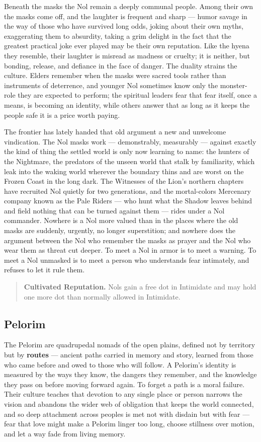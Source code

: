 Beneath the masks the Nol remain a deeply communal people. Among their own the masks come off, and the laughter is frequent and sharp --- humor savage in the way of those who have survived long odds, joking about their own myths, exaggerating them to absurdity, taking a grim delight in the fact that the greatest practical joke ever played may be their own reputation. Like the hyena they resemble, their laughter is misread as madness or cruelty; it is neither, but bonding, release, and defiance in the face of danger. The duality strains the culture. Elders remember when the masks were sacred tools rather than instruments of deterrence, and younger Nol sometimes know only the monster-role they are expected to perform; the spiritual leaders fear that fear itself, once a means, is becoming an identity, while others answer that as long as it keeps the people safe it is a price worth paying.

The frontier has lately handed that old argument a new and unwelcome vindication. The Nol masks work --- demonstrably, measurably --- against exactly the kind of thing the settled world is only now learning to name: the hunters of the Nightmare, the predators of the unseen world that stalk by familiarity, which leak into the waking world wherever the boundary thins and are worst on the Frozen Coast in the long dark. The Witnesses of the Lion's northern chapters have recruited Nol quietly for two generations, and the mortal-colors Mercenary company known as the Pale Riders --- who hunt what the Shadow leaves behind and field nothing that can be turned against them --- rides under a Nol commander. Nowhere is a Nol more valued than in the places where the old masks are suddenly, urgently, no longer superstition; and nowhere does the argument between the Nol who remember the masks as prayer and the Nol who wear them as threat cut deeper. To meet a Nol in armor is to meet a warning. To meet a Nol unmasked is to meet a person who understands fear intimately, and refuses to let it rule them.

\begin{quote}
\textbf{Cultivated Reputation.} Nols gain a free dot in Intimidate and may hold one more dot than normally allowed in Intimidate.
\end{quote}

\subsection{Pelorim}

The Pelorim are quadrupedal nomads of the open plains, defined not by territory but by \textbf{routes} --- ancient paths carried in memory and story, learned from those who came before and owed to those who will follow. A Pelorim's identity is measured by the ways they know, the dangers they remember, and the knowledge they pass on before moving forward again. To forget a path is a moral failure. Their culture teaches that devotion to any single place or person narrows the vision and abandons the wider web of obligation that keeps the world connected, and so deep attachment across peoples is met not with disdain but with fear --- fear that love might make a Pelorim linger too long, choose stillness over motion, and let a way fade from living memory.

